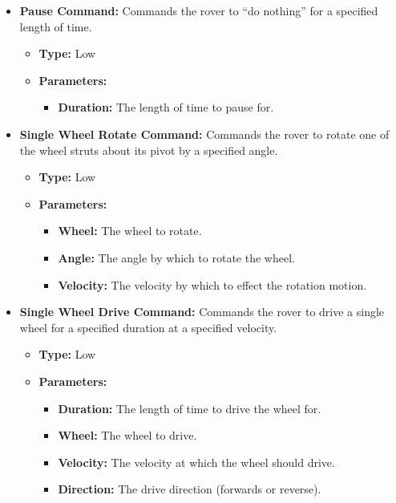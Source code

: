         \begin{itemize}
          \item \textbf{Pause Command:} Commands the rover to ``do nothing'' for a specified length of time.
          \begin{itemize}
            \item \textbf{Type:} Low
            \item \textbf{Parameters:}
            \begin{itemize}
              \item \textbf{Duration:} The length of time to pause for.
            \end{itemize}
          \end{itemize}
          
          \item \textbf{Single Wheel Rotate Command:} Commands the rover to rotate one of the wheel struts about its pivot by a specified angle.
          \begin{itemize}
            \item \textbf{Type:} Low
            \item \textbf{Parameters:}
            \begin{itemize}
              \item \textbf{Wheel:} The wheel to rotate.
              \item \textbf{Angle:} The angle by which to rotate the wheel.
              \item \textbf{Velocity:} The velocity by which to effect the rotation motion.
            \end{itemize}
          \end{itemize}
        
          \item \textbf{Single Wheel Drive Command:} Commands the rover to drive a single wheel for a specified duration at a specified velocity.
          \begin{itemize}
            \item \textbf{Type:} Low
            \item \textbf{Parameters:}
            \begin{itemize}
              \item \textbf{Duration:} The length of time to drive the wheel for.
              \item \textbf{Wheel:} The wheel to drive.
              \item \textbf{Velocity:} The velocity at which the wheel should drive.
              \item \textbf{Direction:} The drive direction (forwards or reverse).
            \end{itemize}
          \end{itemize}
          

\end{itemize}
